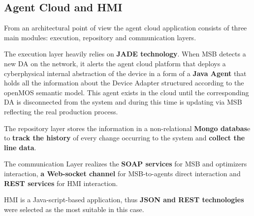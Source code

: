 \subsection{Agent Cloud and HMI}
From an architectural point of view the agent cloud application consists of three main modules: execution, repository and communication layers.

The execution layer heavily relies on \textbf{\gls{JADE} technology}. 
When \gls{MSB} detects a new \gls{DA} on the network, it alerts the agent cloud platform that deploys a cyberphysical internal abstraction of the device in a form of a \textbf{Java Agent} that holds all the information about the Device Adapter structured according to the openMOS semantic model. 
This agent exists in the cloud until the corresponding \gls{DA} is disconnected from the system and during this time is updating via \gls{MSB} reflecting the real production process.

The repository layer stores the information in a non-relational \textbf{Mongo databas}e to \textbf{track the history} of every change occurring to the system and \textbf{collect the line data}. 

The communication Layer realizes the\textbf{ \gls{SOAP} services} for MSB and optimizers interaction,\textbf{ a Web-socket channel} for MSB-to-agents direct interaction and \textbf{\gls{REST} services} for HMI interaction. 

\gls{HMI} is a Java-script-based application, thus \textbf{\gls{JSON} and \gls{REST} technologies} were selected as the most suitable in this case.